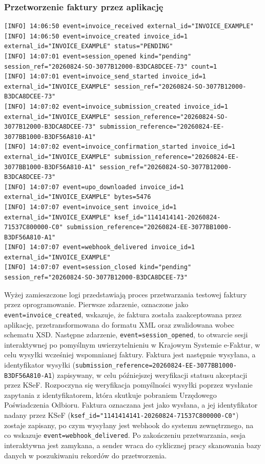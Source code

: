 \subsubsection{Przetworzenie faktury przez aplikację}

\begin{lstlisting}[style=thesiscode, caption={Logi przetwarzania faktury testowej}, label={lst:scenario-processing-logs}]
[INFO] 14:06:50 event=invoice_received external_id="INVOICE_EXAMPLE"
[INFO] 14:06:50 event=invoice_created invoice_id=1 external_id="INVOICE_EXAMPLE" status="PENDING"
[INFO] 14:07:01 event=session_opened kind="pending" session_ref="20260824-SO-3077B12000-B3DCA8DCEE-73" count=1
[INFO] 14:07:01 event=invoice_send_started invoice_id=1 external_id="INVOICE_EXAMPLE" session_ref="20260824-SO-3077B12000-B3DCA8DCEE-73"
[INFO] 14:07:02 event=invoice_submission_created invoice_id=1 external_id="INVOICE_EXAMPLE" session_reference="20260824-SO-3077B12000-B3DCA8DCEE-73" submission_reference="20260824-EE-3077BB1000-B3DF56A810-A1"
[INFO] 14:07:02 event=invoice_confirmation_started invoice_id=1 external_id="INVOICE_EXAMPLE" submission_reference="20260824-EE-3077BB1000-B3DF56A810-A1" session_ref="20260824-SO-3077B12000-B3DCA8DCEE-73"
[INFO] 14:07:07 event=upo_downloaded invoice_id=1 external_id="INVOICE_EXAMPLE" bytes=5476
[INFO] 14:07:07 event=invoice_sent invoice_id=1 external_id="INVOICE_EXAMPLE" ksef_id="1141414141-20260824-71537C800000-C0" submission_reference="20260824-EE-3077BB1000-B3DF56A810-A1"
[INFO] 14:07:07 event=webhook_delivered invoice_id=1 external_id="INVOICE_EXAMPLE"
[INFO] 14:07:07 event=session_closed kind="pending" session_ref="20260824-SO-3077B12000-B3DCA8DCEE-73"
\end{lstlisting}

Wyżej zamieszczone logi przedstawiają proces przetwarzania testowej faktury przez oprogramowanie. Pierwsze zdarzenie, oznaczone jako \texttt{event=invoice\_created}, wskazuje, że faktura została zaakceptowana przez aplikację, przetransformowana do formatu XML oraz zwalidowana wobec schematu XSD. Następne zdarzenie, \texttt{event=session\_opened}, to otwarcie sesji interaktywnej po pomyślnym uwierzytelnieniu w Krajowym Systemie e-Faktur, w celu wysyłki wcześniej wspomnianej faktury. Faktura jest następnie wysyłana, a identyfikator wysyłki (\texttt{submission\_reference=20260824-EE-3077BB1000-B3DF56A810-A1}) zapisywany, w celu późniejszej weryfikacji statusu akceptacji przez KSeF. Rozpoczyna się weryfikacja pomyślności wysyłki poprzez wysłanie zapytania z identyfikatorem, która skutkuje pobraniem Urzędowego Poświadczenia Odbioru. Faktura oznaczana jest jako wysłana, a jej identyfikator nadany przez KSeF (\texttt{ksef\_id="1141414141-20260824-71537C800000-C0"}) zostaje zapisany, po czym wysyłany jest webhook do systemu zewnętrznego, na co wskazuje \texttt{event=webhook\_delivered}. Po zakończeniu przetwarzania, sesja interaktywna jest zamykana, a sender wraca do cyklicznej pracy skanowania bazy danych w poszukiwaniu rekordów do przetworzenia.

